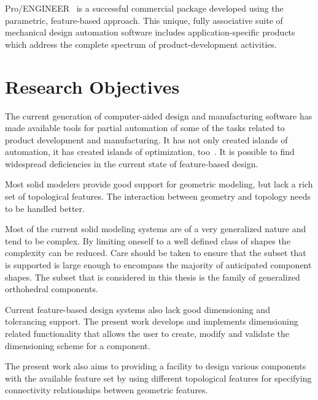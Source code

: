 		Pro/ENGINEER~\cite{ProE} is a successful commercial 
		package developed using the parametric, feature-based approach.
		This unique, fully associative suite of mechanical design automation 
		software includes application-specific products which address the 
		complete spectrum of product-development activities.

	\section{Research Objectives}

		The current generation of computer-aided design and manufacturing
		software has made available tools for partial automation of some of the 
		tasks related to product development and manufacturing.
		It has not only created islands of automation, it has created 
		islands of optimization, too~\cite{ShahMa}.
		It is possible to find widespread deficiencies in the current
		state of feature-based design.

		Most solid modelers provide good support for geometric
		modeling, but lack a rich set of topological 
		features. The interaction between geometry and topology needs to be
		handled better.

		Most of the current solid modeling systems are of a very generalized 
		nature and tend to be complex. By limiting oneself to a well defined
		class of shapes the complexity can be reduced.
		Care should be taken to ensure that the subset that is supported is 
		large enough to encompass the majority of anticipated component shapes.
		The subset that is considered in this thesis is the family of 
		generalized orthohedral components.


		Current feature-based design systems also lack good
		dimensioning and tolerancing support. The present work develops and
		implements dimensioning related functionality that allows the user
		to create, modify and validate the dimensioning scheme for a component.

		The present work also aims to providing a facility to design various
		components with the available feature set by using different
		topological features for specifying connectivity relationships between
		geometric features. 



